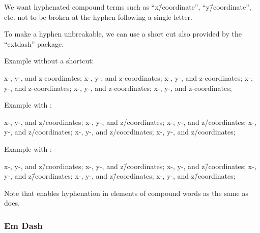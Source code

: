 We want hyphenated compound terms such as ``x\=/coordinate'',
``y\=/coordinate'', etc. not to be broken at the hyphen
following a single letter.

To make a hyphen unbreakable, we can use a short cut
\qco{\\=/} also provided by the ``extdash'' package.

Example without a shortcut:

\begin{center}\begin{minipage}{2.55in}\vspace{0.6\baselineskip}
x-, y-, and z-coordinates; x-, y-, and z-coordinates;
x-, y-, and z-coordinates; x-, y-, and z-coordinates;
x-, y-, and z-coordinates; x-, y-, and z-coordinates;
\vspace{0.6\baselineskip}\end{minipage}\end{center}

Example with \qco{\\-/}:

\begin{center}\begin{minipage}{2.55in}\vspace{0.6\baselineskip}
x-, y-, and z\-/coordinates; x-, y-, and z\-/coordinates;
x-, y-, and z\-/coordinates; x-, y-, and z\-/coordinates;
x-, y-, and z\-/coordinates; x-, y-, and z\-/coordinates;
\vspace{0.6\baselineskip}\end{minipage}\end{center}

Example with \qco{\\=/}:

\begin{center}\begin{minipage}{2.55in}\vspace{0.6\baselineskip}
x-, y-, and z\=/coordinates; x-, y-, and z\=/coordinates;
x-, y-, and z\=/coordinates; x-, y-, and z\=/coordinates;
x-, y-, and z\=/coordinates; x-, y-, and z\=/coordinates;
\vspace{0.6\baselineskip}\end{minipage}\end{center}

Note that \qco{\\=/} enables hyphenation in elements
of compound words as the same as \qco{\\-/} does.

\subsubsection{Em Dash}
\label{sec:app:styleguide:Em Dash}

